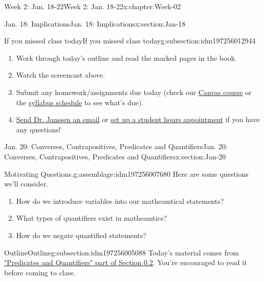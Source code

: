 \documentclass[oneside,10pt,]{book}
\numberwithin{equation}{section}
\begin{document}
\begin{chapterptx}{Week 2: Jan. 18-22}{}{Week 2: Jan. 18-22}{}{}{x:chapter:Week-02}
\begin{sectionptx}{Jan. 18: Implications}{}{Jan. 18: Implications}{}{}{x:section:Jan-18}
%
\begin{subsectionptx}{If you missed class today}{}{If you missed class today}{}{}{g:subsection:idm197256012944}
%
\begin{enumerate}
\item{}Work through today's outline and read the marked pages in the book.%
\item{}Watch the screencast above.%
\item{}Submit any homework\slash{}assignments due today (check our \href{https://dordt.instructure.com/courses/3110050}{Canvas course} or the \href{https://prof.mkjanssen.org/ds/index.html\#schedule}{syllabus schedule} to see what's due).%
\item{}\href{mailto:mike.janssen@dordt.edu}{Send Dr. Janssen an email} or \href{https://calendly.com/mkjanssen/student-hours}{set up a student hours appointment} if you have any questions!%
\end{enumerate}
\end{subsectionptx}
\end{sectionptx}
%
%
\typeout{************************************************}
\typeout{************************************************}
%
\begin{sectionptx}{Jan. 20: Converses, Contrapositives, Predicates and Quantifiers}{}{Jan. 20: Converses, Contrapositives, Predicates and Quantifiers}{}{}{x:section:Jan-20}
\begin{introduction}{}%
\begin{assemblage}{Motivating Questions.}{g:assemblage:idm197256007680}%
Here are some questions we'll consider. %
\begin{enumerate}
\item{}How do we introduce variables into our matheamtical statements?%
\item{}What types of quantifiers exist in matheamtics?%
\item{}How do we negate quantified statements?%
\end{enumerate}
%
\end{assemblage}
\end{introduction}%
%
%
\typeout{************************************************}
\typeout{************************************************}
%
\begin{subsectionptx}{Outline}{}{Outline}{}{}{g:subsection:idm197256005088}
Today's material comes from \href{http://discrete.openmathbooks.org/dmoi3/sec_intro-statements.html\#IYE}{"Predicates and Quantifiers" part of Section 0.2}. You're encouraged to read it before coming to class.%

\end{subsectionptx}
\end{sectionptx}
\end{chapterptx}
\end{document}
